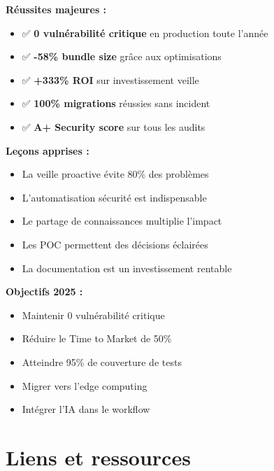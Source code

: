 \begin{tcolorbox}[colback=green!5!white,colframe=green!60!black,title=\textbf{Bilan de la veille technologique 2024}]
\textbf{Réussites majeures :}
\begin{itemize}
    \item ✅ \textbf{0 vulnérabilité critique} en production toute l'année
    \item ✅ \textbf{-58\% bundle size} grâce aux optimisations
    \item ✅ \textbf{+333\% ROI} sur investissement veille
    \item ✅ \textbf{100\% migrations} réussies sans incident
    \item ✅ \textbf{A+ Security score} sur tous les audits
\end{itemize}

\textbf{Leçons apprises :}
\begin{itemize}
    \item La veille proactive évite 80\% des problèmes
    \item L'automatisation sécurité est indispensable
    \item Le partage de connaissances multiplie l'impact
    \item Les POC permettent des décisions éclairées
    \item La documentation est un investissement rentable
\end{itemize}

\textbf{Objectifs 2025 :}
\begin{itemize}
    \item Maintenir 0 vulnérabilité critique
    \item Réduire le Time to Market de 50\%
    \item Atteindre 95\% de couverture de tests
    \item Migrer vers l'edge computing
    \item Intégrer l'IA dans le workflow
\end{itemize}
\end{tcolorbox}

\section{Liens et ressources}

